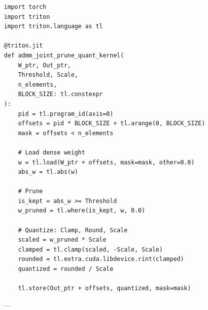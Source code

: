 \begin{lstlisting}
import torch
import triton
import triton.language as tl

@triton.jit
def admm_joint_prune_quant_kernel(
    W_ptr, Out_ptr,
    Threshold, Scale,
    n_elements,
    BLOCK_SIZE: tl.constexpr
):
    pid = tl.program_id(axis=0)
    offsets = pid * BLOCK_SIZE + tl.arange(0, BLOCK_SIZE)
    mask = offsets < n_elements

    # Load dense weight
    w = tl.load(W_ptr + offsets, mask=mask, other=0.0)
    abs_w = tl.abs(w)

    # Prune
    is_kept = abs_w >= Threshold
    w_pruned = tl.where(is_kept, w, 0.0)

    # Quantize: Clamp, Round, Scale
    scaled = w_pruned * Scale
    clamped = tl.clamp(scaled, -Scale, Scale)
    rounded = tl.extra.cuda.libdevice.rint(clamped)
    quantized = rounded / Scale

    tl.store(Out_ptr + offsets, quantized, mask=mask)
\end{lstlisting}


---